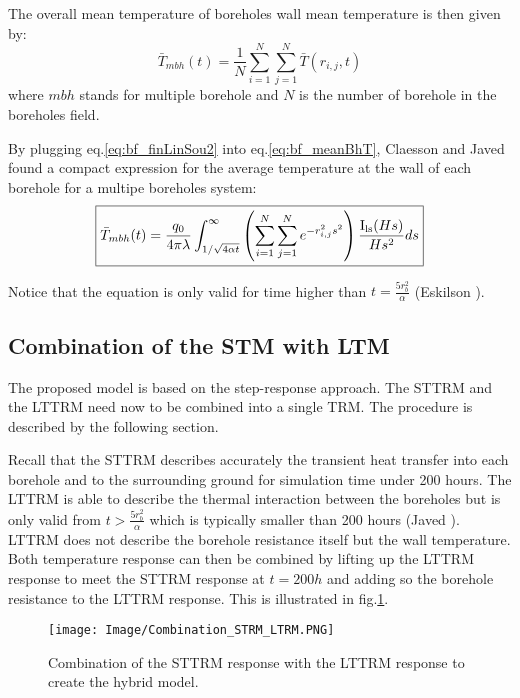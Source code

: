 \documentclass[a4paper,oneside,11pt]{report}
\begin{document}
{The overall mean temperature of boreholes wall mean temperature is then given by:
\begin{equation} \label{eq:bf_meanBhT}
	\bar{T}_{mbh}(t) = \frac{1}{N} \sum^N_{i=1} \sum^N_{j=1} \bar{T}(r_{i,j} , t)
\end{equation}
where $mbh$ stands for multiple borehole and $N$ is the number of borehole in the boreholes field. 

By plugging eq.\ref{eq:bf_finLinSou2} into eq.\ref{eq:bf_meanBhT}, Claesson and Javed found a compact expression for the average temperature at the wall of each borehole for a multipe boreholes system:
\begin{equation} \label{eq:bf_Tmbh}
\boxed{
	\bar{T}_{mbh}(t) = \frac{q_0}{4 \pi \lambda} \int^\infty_{1/\sqrt{4 \alpha t}} \left( \sum^N_{i=1} \sum^N_{j=1}e^{-r_{i,j}^2 s^2} \right) \frac{\mathrm{I_{ls}}(H s)}{H s^2} ds \\
}
\end{equation} 

Notice that the equation is only valid for time higher than $t = \frac{5 r_b^2}{\alpha}$ (Eskilson \cite{esk87}).

\subsection{Combination of the STM with LTM} \label{ssec:bf_imp_com}
The proposed model is based on the step-response approach. The STTRM and the LTTRM need now to be combined into a single TRM. The procedure is described by the following section.

Recall that the STTRM describes accurately the transient heat transfer into each borehole and to the surrounding ground for simulation time under 200 hours. The LTTRM is able to describe the thermal interaction between the boreholes but is only valid from $t > \frac{5 r_b^2}{\alpha}$ which is typically smaller than 200 hours (Javed \cite{jav12}). LTTRM does not describe the borehole resistance itself but the wall temperature. Both temperature response can then be combined by lifting up the LTTRM response to meet the STTRM response at $t=200 h$ and adding so the borehole resistance to the LTTRM response. This is illustrated in fig.\ref{fig:bf_comb}.

	\begin{figure}[hbtp] 
		\centering
		\texttt{[image: Image/Combination\_STRM\_LTRM.PNG]}
		\caption{Combination of the STTRM response with the LTTRM response to create the hybrid model.}
		\label{fig:bf_comb}
	\end{figure}
	
}
\end{document}
